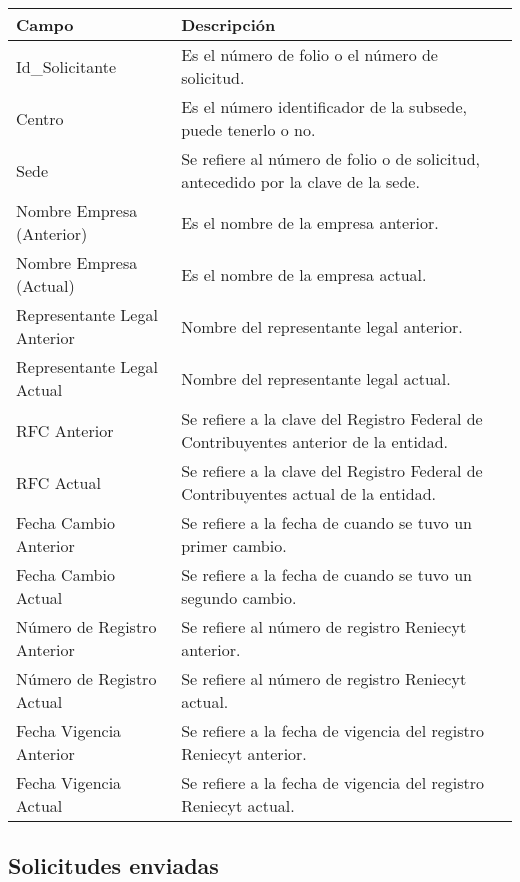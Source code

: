\begin{tabular}{ m{} m{}  }%
	\rowcolor{gray1} {\bf Campo} &  {\bf Descripción} \\ \hline \hline

	Id\_Solicitante & Es el número de folio o el número de solicitud.\\
	\rowcolor{gray1}Centro & Es el número identificador de la subsede, puede tenerlo o no.\\
	Sede & Se refiere al número de folio o de solicitud, antecedido por la clave de la sede.\\
	\rowcolor{gray1}Nombre Empresa (Anterior) & Es el nombre de la empresa anterior.\\
	Nombre Empresa (Actual) & Es el nombre de la empresa  actual.\\
	\rowcolor{gray1}Representante Legal Anterior  & Nombre del representante legal anterior.\\
	Representante Legal Actual & Nombre del representante legal actual.\\
	\rowcolor{gray1}RFC Anterior & Se refiere a la clave del Registro Federal de Contribuyentes anterior de la entidad.\\
	RFC Actual & Se refiere a la clave del Registro Federal de Contribuyentes actual de la entidad.\\
	\rowcolor{gray1}Fecha Cambio Anterior & Se refiere a la fecha de cuando se tuvo un primer cambio.\\
	Fecha Cambio Actual & Se refiere a la fecha de cuando se tuvo un segundo cambio.\\
	\rowcolor{gray1}Número de Registro Anterior & Se refiere al número de registro Reniecyt anterior.\\
	Número de Registro Actual & Se refiere al número de registro Reniecyt actual.\\
	\rowcolor{gray1}Fecha Vigencia Anterior & Se refiere a la fecha de vigencia del registro Reniecyt anterior.\\
	Fecha Vigencia Actual & Se refiere a la fecha de vigencia del registro Reniecyt actual.\\
\end{tabular}


\subsection{Solicitudes enviadas}
\label{appendix:Reportes:PeopleSoft:SolicitudesEnviadas}

